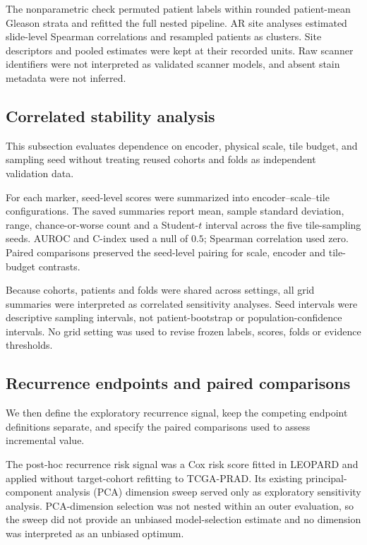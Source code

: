 The nonparametric check permuted patient labels within rounded patient-mean Gleason strata
and refitted the full nested pipeline. AR site analyses estimated slide-level Spearman
correlations and resampled patients as clusters. Site descriptors and pooled estimates were
kept at their recorded units. Raw scanner identifiers were not interpreted as validated
scanner models, and absent stain metadata were not inferred.

\subsection{Correlated stability analysis}

This subsection evaluates dependence on encoder, physical scale, tile budget, and sampling
seed without treating reused cohorts and folds as independent validation data.

For each marker, seed-level scores were summarized into encoder--scale--tile configurations.
The saved summaries report mean, sample standard deviation, range, chance-or-worse count and
a Student-$t$ interval across the five tile-sampling seeds. AUROC and C-index used a null of
$0.5$; Spearman correlation used zero. Paired comparisons preserved the seed-level pairing
for scale, encoder and tile-budget contrasts.

Because cohorts, patients and folds were shared across settings, all grid summaries were
interpreted as correlated sensitivity analyses. Seed intervals were descriptive sampling
intervals, not patient-bootstrap or population-confidence intervals. No grid setting was
used to revise frozen labels, scores, folds or evidence thresholds.

\subsection{Recurrence endpoints and paired comparisons}

We then define the exploratory recurrence signal, keep the competing endpoint definitions
separate, and specify the paired comparisons used to assess incremental value.

The post-hoc recurrence risk signal was a Cox risk score fitted in LEOPARD and applied
without target-cohort refitting to TCGA-PRAD. Its existing principal-component analysis
(PCA) dimension sweep served only as exploratory sensitivity analysis. PCA-dimension
selection was not nested within an outer evaluation,
so the sweep did not provide an unbiased model-selection estimate and no dimension was
interpreted as an unbiased optimum.

